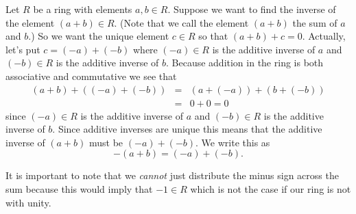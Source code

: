 \documentclass[12pt]{article}
\begin{document}
Let $R$ be a ring with elements $a, b \in R$.  
Suppose we want to find the inverse of the element $(a + b) \in R$.  
(Note that we call the element $(a+b)$ the sum of $a$ and $b$.)  
So we want the unique element $c \in R$ so that $(a + b) + c = 0$.  
Actually, let's put $c = (-a) + (-b)$ where $(-a) \in R$ is the additive inverse of $a$ and $(-b) \in R$ is the additive inverse of $b$.  
Because addition in the ring is both associative and commutative we see that
\begin{eqnarray*}
(a + b) + ((-a) + (-b)) & = & (a + (-a)) +(b + (-b))\\
 & = & 0 + 0 = 0
\end{eqnarray*}
since $(-a) \in R$ is the additive inverse of $a$ and $(-b) \in R$ is the additive inverse of $b$.  
Since additive inverses are unique this means that the additive inverse of $(a + b)$ must be $(-a) + (-b)$.  We write this as
\[ -(a + b) = (-a) + (-b). \]

It is important to note that we {\em cannot} just distribute the minus sign across the sum because this would imply that $-1 \in R$ which is not the case if our ring is not with unity.
\end{document}
